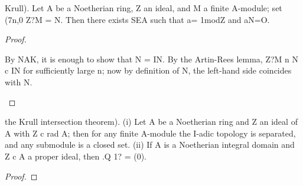 \begin{theorem}[Theorem 8.9]\label{mcrt-auto-theorem-8-9}\uses{}
\begin{mathematicalrecord}
Krull). Let A be a Noetherian ring, Z an ideal, and M
 a finite A-module; set (7n,0 Z?M = N. Then there exists SEA such that
a= 1modZ and aN=O.
\end{mathematicalrecord}
\end{theorem}
\begin{proof}
\begin{mathematicalrecord}
By NAK, it is enough to show that N = IN. By the Artin-Rees
lemma, Z?M n N c IN for sufficiently large n; now by definition of N, the
left-hand side coincides with N.
\end{mathematicalrecord}
\end{proof}


\begin{theorem}[Theorem 8.10]\label{mcrt-auto-theorem-8-10}\uses{}
\begin{mathematicalrecord}
the Krull intersection theorem).
  (i) Let A be a Noetherian ring and Z an ideal of A with Z c rad A; then for
any finite A-module the I-adic topology is separated, and any submodule is
a closed set.
  (ii) If A is a Noetherian integral domain and Z c A a proper ideal, then
           .Q 1? = (0).
\end{mathematicalrecord}
\end{theorem}
\begin{proof}
\end{proof}


